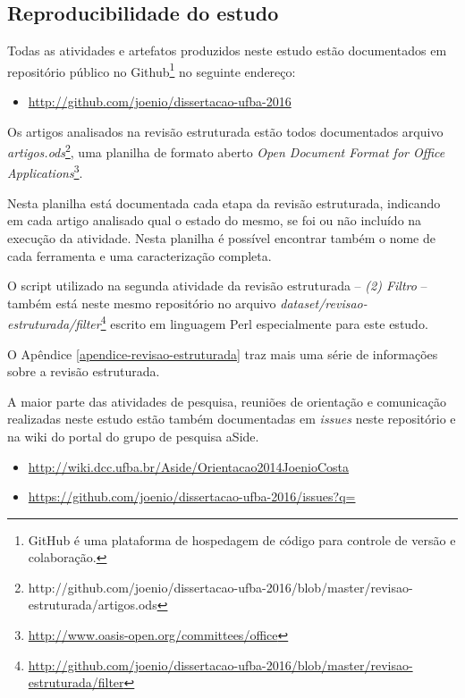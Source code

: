 \subsection{Reproducibilidade do estudo}

Todas as atividades e artefatos produzidos neste estudo estão documentados em
repositório público no Github\footnote{GitHub é uma plataforma de hospedagem de
código para controle de versão e colaboração.} no seguinte endereço:

\begin{itemize}
  \item \url{http://github.com/joenio/dissertacao-ufba-2016}
\end{itemize}

Os artigos analisados na revisão estruturada estão todos documentados arquivo
{\it
artigos.ods}\footnote{http://github.com/joenio/dissertacao-ufba-2016/blob/master/revisao-estruturada/artigos.ods},
uma planilha de formato aberto {\it Open Document Format for Office
Applications}\footnote{\url{http://www.oasis-open.org/committees/office}}.

Nesta planilha está documentada cada etapa da revisão estruturada, indicando em
cada artigo analisado qual o estado do mesmo, se foi ou não incluído na
execução da atividade.  Nesta planilha é possível encontrar também o nome de
cada ferramenta e uma caracterização completa.

O script utilizado na segunda atividade da revisão estruturada -- {\it (2)
Filtro} -- também está neste mesmo repositório no arquivo {\it
dataset/revisao-estruturada/filter}\footnote{\url{http://github.com/joenio/dissertacao-ufba-2016/blob/master/revisao-estruturada/filter}}
escrito em linguagem Perl especialmente para este estudo.

O Apêndice \ref{apendice-revisao-estruturada} traz mais uma série de informações sobre a revisão estruturada.

A maior parte das atividades de pesquisa, reuniões de orientação e comunicação
realizadas neste estudo estão também documentadas em {\it issues} neste
repositório e na wiki do portal do grupo de pesquisa aSide.

\begin{itemize}
  \item \url{http://wiki.dcc.ufba.br/Aside/Orientacao2014JoenioCosta}
  \item \url{https://github.com/joenio/dissertacao-ufba-2016/issues?q=}
\end{itemize}
